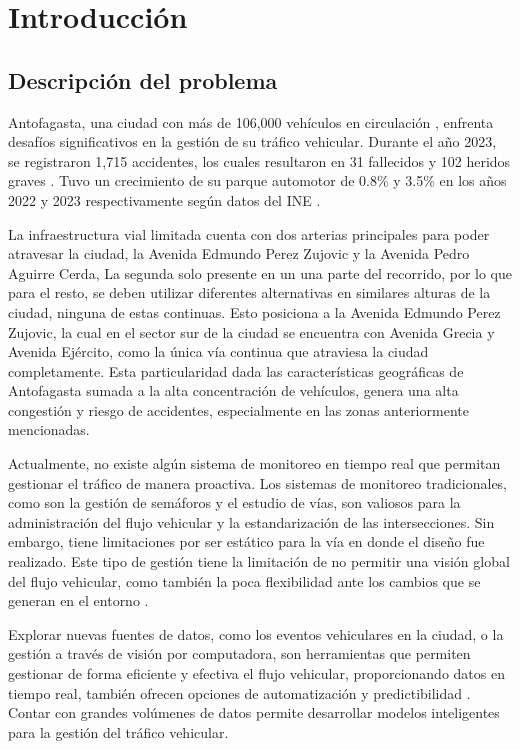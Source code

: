 \documentclass[12pt]{article}
\begin{document}
\section{Introducción}
\subsection{Descripción del problema}

Antofagasta, una ciudad con más de 106,000 vehículos en circulación \parencite{conaset2023}, enfrenta desafíos significativos en la gestión de su tráfico vehicular. Durante el año 2023, se registraron 1,715 accidentes, los cuales resultaron en 31 fallecidos y 102 heridos graves \parencite{conaset2023}. Tuvo un crecimiento de su parque automotor de 0.8\% y 3.5\% en los años 2022 y 2023 respectivamente según datos del INE \parencite{ine2023}.

La infraestructura vial limitada cuenta con dos arterias principales para poder atravesar la ciudad, la Avenida Edmundo Perez Zujovic y la Avenida Pedro Aguirre Cerda, La segunda solo presente en un una parte del recorrido, por lo que para el resto, se deben utilizar diferentes alternativas en similares alturas de la ciudad, ninguna de estas continuas. Esto posiciona a la Avenida Edmundo Perez Zujovic, la cual en el sector sur de la ciudad se encuentra con Avenida Grecia y Avenida Ejército, como la única vía continua que atraviesa la ciudad completamente. Esta particularidad dada las características geográficas de Antofagasta sumada a la alta concentración de vehículos, genera una alta congestión y  riesgo de accidentes, especialmente en las zonas anteriormente mencionadas.

Actualmente, no existe algún sistema de monitoreo en tiempo real que permitan gestionar el tráfico de manera proactiva. Los sistemas de monitoreo tradicionales, como son la gestión de semáforos y el estudio de vías, son valiosos para la administración del flujo vehicular y la estandarización de las intersecciones. Sin embargo, tiene limitaciones por ser estático para la vía en donde el diseño fue realizado. Este tipo de gestión tiene la limitación de no permitir una visión global del flujo vehicular, como también la poca flexibilidad ante los cambios que se generan en el entorno \parencite{auld2009}.

Explorar nuevas fuentes de datos, como los eventos vehiculares en la ciudad, o la gestión a través de visión por computadora, son herramientas que permiten gestionar de forma eficiente y efectiva el flujo vehicular, proporcionando datos en tiempo real, también ofrecen opciones de automatización y predictibilidad \parencite{chen2015}. Contar con grandes volúmenes de datos permite desarrollar modelos inteligentes para la gestión del tráfico vehicular.
\end{document}

